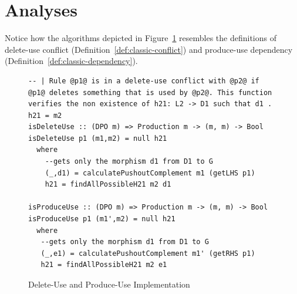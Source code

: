 \section{Analyses}

Notice how the algorithms depicted in Figure~\ref{fig:verigraph:delete-use-produce-use} resembles the definitions of delete-use conflict (Definition~\ref{def:classic-conflict}) and produce-use dependency (Definition~\ref{def:classic-dependency}).

\begin{figure}[!ht]
\caption{Delete-Use and Produce-Use Implementation}
\begin{verbatim}
-- | Rule @p1@ is in a delete-use conflict with @p2@ if @p1@ deletes something that is used by @p2@. This function verifies the non existence of h21: L2 -> D1 such that d1 . h21 = m2
isDeleteUse :: (DPO m) => Production m -> (m, m) -> Bool
isDeleteUse p1 (m1,m2) = null h21
  where
    --gets only the morphism d1 from D1 to G
    (_,d1) = calculatePushoutComplement m1 (getLHS p1) 
    h21 = findAllPossibleH21 m2 d1

isProduceUse :: (DPO m) => Production m -> (m, m) -> Bool
isProduceUse p1 (m1',m2) = null h21
  where
   --gets only the morphism d1 from D1 to G
   (_,e1) = calculatePushoutComplement m1' (getRHS p1)
   h21 = findAllPossibleH21 m2 e1
\end{verbatim}
\label{fig:verigraph:delete-use-produce-use}
\end{figure}


